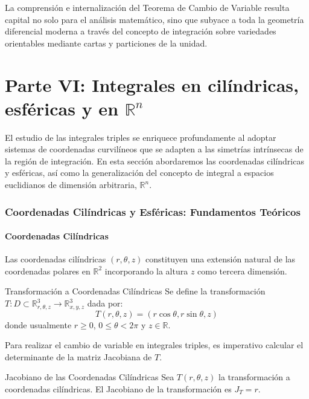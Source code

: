 \documentclass[11pt,a4paper]{article}
\begin{document}
La comprensión e internalización del Teorema de Cambio de Variable resulta capital no solo para el análisis matemático, sino que subyace a toda la geometría diferencial moderna a través del concepto de integración sobre variedades orientables mediante cartas y particiones de la unidad.
\part*{Parte VI: Integrales en cilíndricas, esféricas y en $\mathbb{R}^n$}

El estudio de las integrales triples se enriquece profundamente al adoptar sistemas de coordenadas curvilíneos que se adapten a las simetrías intrínsecas de la región de integración. En esta sección abordaremos las coordenadas cilíndricas y esféricas, así como la generalización del concepto de integral a espacios euclidianos de dimensión arbitraria, $\mathbb{R}^n$.

\section{Coordenadas Cilíndricas y Esféricas: Fundamentos Teóricos}

\subsection{Coordenadas Cilíndricas}

Las coordenadas cilíndricas $(r, \theta, z)$ constituyen una extensión natural de las coordenadas polares en $\mathbb{R}^2$ incorporando la altura $z$ como tercera dimensión.

\begin{definicionbox}{Transformación a Coordenadas Cilíndricas}{}
    Se define la transformación $T: D \subset \mathbb{R}^3_{r,\theta,z} \to \mathbb{R}^3_{x,y,z}$ dada por:
    \[
    T(r, \theta, z) = (r \cos\theta, r \sin\theta, z)
    \]
    donde usualmente $r \geq 0$, $0 \leq \theta < 2\pi$ y $z \in \mathbb{R}$.
\end{definicionbox}

Para realizar el cambio de variable en integrales triples, es imperativo calcular el determinante de la matriz Jacobiana de $T$.

\begin{teoremabox}{Jacobiano de las Coordenadas Cilíndricas}{}
    Sea $T(r, \theta, z)$ la transformación a coordenadas cilíndricas. El Jacobiano de la transformación es $J_T = r$.
\end{teoremabox}
\end{document}
